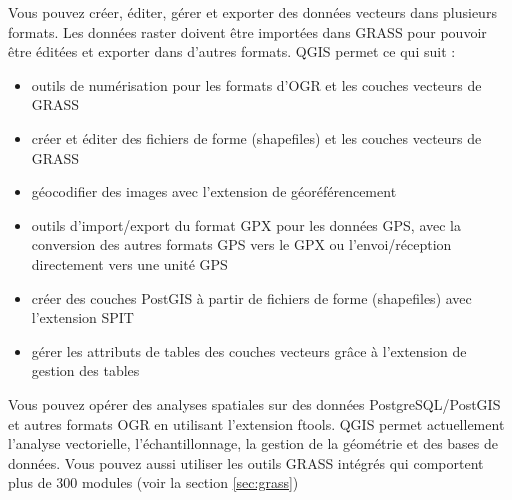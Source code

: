 

Vous pouvez cr\'eer, \'editer, g\'erer et exporter des donn\'ees vecteurs dans plusieurs formats. Les donn\'ees raster doivent \^etre import\'ees dans GRASS pour pouvoir \^etre \'edit\'ees et exporter dans d'autres formats. QGIS permet ce qui suit :  

\begin{itemize}
\item outils de num\'erisation pour les formats d'OGR et les couches vecteurs de GRASS
\item cr\'eer et \'editer des fichiers de forme (shapefiles) et les couches vecteurs de GRASS
\item g\'eocodifier des images avec l'extension de g\'eor\'ef\'erencement
\item outils d'import/export du format GPX pour les donn\'ees GPS, avec la conversion des autres formats GPS vers le GPX ou l'envoi/r\'eception directement vers une unit\'e GPS
\item cr\'eer des couches PostGIS \`a partir de fichiers de forme (shapefiles) avec l'extension SPIT
\item g\'erer les attributs de tables des couches vecteurs gr\^ace \`a l'extension de gestion des tables
\end{itemize}


Vous pouvez op\'erer des analyses spatiales sur des donn\'ees PostgreSQL/PostGIS et autres formats OGR en utilisant l'extension ftools. QGIS permet actuellement l'analyse vectorielle, l'\'echantillonnage, la gestion de la g\'eom\'etrie et des bases de donn\'ees. Vous pouvez aussi utiliser les outils GRASS int\'egr\'es qui comportent plus de 300 modules (voir la section \ref{sec:grass})


